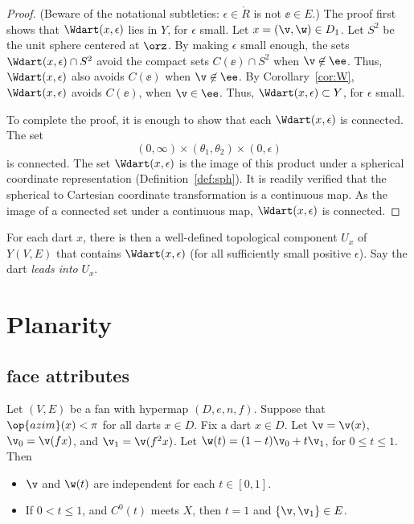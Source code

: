 \begin{proof}  (Beware of the notational subtleties: $\epsilon\in\ring{R}$ is not $\ee\in E$.)  The proof first shows that $\Wdart(x,\epsilon)$ lies in $Y$,
for $\epsilon$ small.  Let $x=(\v,\w)\in D_1$.  
Let $S^2$ be the unit sphere centered at $\orz$.
By making $\epsilon$ small enough,
the sets $\Wdart(x,\epsilon)\cap S^2$
avoid the compact sets $C(\ee)\cap S^2$ when $\v\not\in \ee$.
Thus, $\Wdart(x,\epsilon)$ also avoids $C(\ee)$ when $\v\not\in \ee$.
By Corollary~\ref{cor:W}, $\Wdart(x,\epsilon)$ avoids $C(\ee)$, when $\v\in \ee$.
Thus, $\Wdart(x,\epsilon)\subset Y$, for $\epsilon$ small.

To complete the proof, it is enough to show that each $\Wdart(x,\epsilon)$ is
connected.  
The  set
   $$
    (0,\infty) \times (\theta_1,\theta_2) \times (0,\epsilon)
   $$
is connected.
The set $\Wdart(x,\epsilon)$  is the image of this product
under a spherical coordinate representation (Definition~\ref{def:sph}).
%
It is readily verified that the spherical to Cartesian coordinate transformation is
a continuous map. As the image of a connected set under a continuous map, $\Wdart(x,\epsilon)$ is connected.
\end{proof}
%
%

\begin{definition} For each dart $x$, 
there is then a well-defined topological
component $U_x$ of $Y(V,E)$ 
that contains $\Wdart(x,\epsilon)$ (for all
sufficiently small positive $\epsilon$). Say the dart {\it leads into}
$U_x$.
\end{definition}
%


\section{Planarity}


\subsection{face attributes}


\begin{lemma}[sweep]\label{lemma:sweep}  
Let $(V,E)$ be a fan with hypermap $(D,e,n,f)$.  
Suppose that $\op{azim}(x)<\pi$
for all darts $x\in D$.  Fix a dart $x\in D$.
Let $\v = \v(x)$, $\v_0 = \v(f x)$,
and $\v_1 = \v(f^2 x)$.  Let $\w(t) = (1-t) \v_0 + t \v_1$, for
$0\le t\le 1$.  Then
\begin{itemize}
\item $\v$ and $\w(t)$ are independent for each $t\in[0,1]$.
\item If $0 < t \le 1$, and $C^0(t)$ meets $X$, then $t=1$ and $\{\v,\v_1\}\in E$.
\end{itemize}
\end{lemma}



